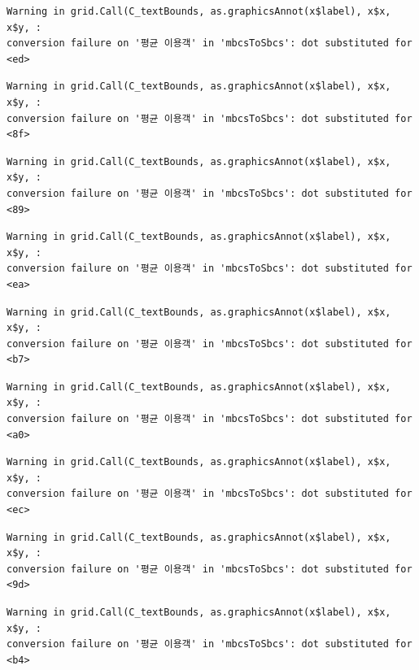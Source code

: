 \documentclass[
  letterpaper,
  DIV=11,
  numbers=noendperiod]{scrreprt}
\begin{document}
\begin{verbatim}
Warning in grid.Call(C_textBounds, as.graphicsAnnot(x$label), x$x, x$y, :
conversion failure on '평균 이용객' in 'mbcsToSbcs': dot substituted for <ed>
\end{verbatim}

\begin{verbatim}
Warning in grid.Call(C_textBounds, as.graphicsAnnot(x$label), x$x, x$y, :
conversion failure on '평균 이용객' in 'mbcsToSbcs': dot substituted for <8f>
\end{verbatim}

\begin{verbatim}
Warning in grid.Call(C_textBounds, as.graphicsAnnot(x$label), x$x, x$y, :
conversion failure on '평균 이용객' in 'mbcsToSbcs': dot substituted for <89>
\end{verbatim}

\begin{verbatim}
Warning in grid.Call(C_textBounds, as.graphicsAnnot(x$label), x$x, x$y, :
conversion failure on '평균 이용객' in 'mbcsToSbcs': dot substituted for <ea>
\end{verbatim}

\begin{verbatim}
Warning in grid.Call(C_textBounds, as.graphicsAnnot(x$label), x$x, x$y, :
conversion failure on '평균 이용객' in 'mbcsToSbcs': dot substituted for <b7>
\end{verbatim}

\begin{verbatim}
Warning in grid.Call(C_textBounds, as.graphicsAnnot(x$label), x$x, x$y, :
conversion failure on '평균 이용객' in 'mbcsToSbcs': dot substituted for <a0>
\end{verbatim}

\begin{verbatim}
Warning in grid.Call(C_textBounds, as.graphicsAnnot(x$label), x$x, x$y, :
conversion failure on '평균 이용객' in 'mbcsToSbcs': dot substituted for <ec>
\end{verbatim}

\begin{verbatim}
Warning in grid.Call(C_textBounds, as.graphicsAnnot(x$label), x$x, x$y, :
conversion failure on '평균 이용객' in 'mbcsToSbcs': dot substituted for <9d>
\end{verbatim}

\begin{verbatim}
Warning in grid.Call(C_textBounds, as.graphicsAnnot(x$label), x$x, x$y, :
conversion failure on '평균 이용객' in 'mbcsToSbcs': dot substituted for <b4>
\end{verbatim}
\end{document}
